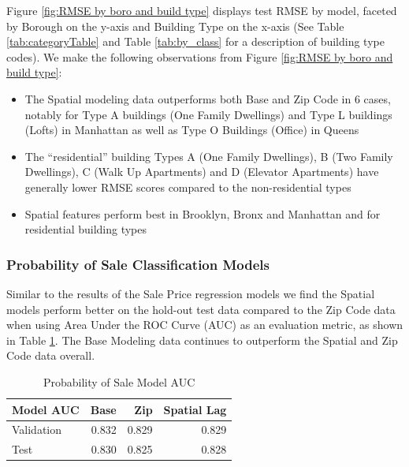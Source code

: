 \documentclass[12pt,]{article}
\providecommand{\tightlist}{%
  \setlength{\itemsep}{0pt}\setlength{\parskip}{0pt}}
\begin{document}
Figure \ref{fig:RMSE by boro and build type} displays test RMSE by
model, faceted by Borough on the y-axis and Building Type on the x-axis
(See Table \ref{tab:categoryTable} and Table \ref{tab:by_class} for a
description of building type codes). We make the following observations
from Figure \ref{fig:RMSE by boro and build type}:

\begin{itemize}
\tightlist
\item
  The Spatial modeling data outperforms both Base and Zip Code in 6
  cases, notably for Type A buildings (One Family Dwellings) and Type L
  buildings (Lofts) in Manhattan as well as Type O Buildings (Office) in
  Queens
\item
  The ``residential'' building Types A (One Family Dwellings), B (Two
  Family Dwellings), C (Walk Up Apartments) and D (Elevator Apartments)
  have generally lower RMSE scores compared to the non-residential types
\item
  Spatial features perform best in Brooklyn, Bronx and Manhattan and for
  residential building types
\end{itemize}

\hypertarget{probability-of-sale-classification-models}{%
\subsubsection{Probability of Sale Classification
Models}\label{probability-of-sale-classification-models}}

Similar to the results of the Sale Price regression models we find the
Spatial models perform better on the hold-out test data compared to the
Zip Code data when using Area Under the ROC Curve (AUC) as an evaluation
metric, as shown in Table \ref{tab:ProbSaleModelAUC}. The Base Modeling
data continues to outperform the Spatial and Zip Code data overall.

\begin{table}

\caption{\label{tab:Prob Model AUC}\label{tab:ProbSaleModelAUC} Probability of Sale Model AUC}
\centering
\begin{tabular}[t]{lrrr}
\toprule
Model AUC & Base & Zip & Spatial Lag\\
\midrule
Validation & 0.832 & 0.829 & 0.829\\
Test & 0.830 & 0.825 & 0.828\\
\bottomrule
\end{tabular}
\end{table}
\end{document}
